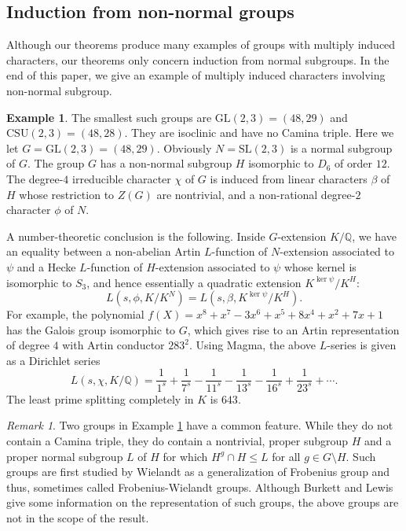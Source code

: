 \documentclass[a4paper,12pt]{article}
\newcommand{\field}[1]{\mathbb{#1}}
\newcommand{\Q}{\field{Q}}
\theoremstyle{definition}
\newtheorem{example}[theorem]{Example}
\theoremstyle{remark}
\newtheorem{remark}[theorem]{Remark}
\numberwithin{equation}{section}
\begin{document}
\subsection{Induction from non-normal groups}
Although our theorems produce many examples of groups with multiply 
induced characters, our theorems only concern induction from normal subgroups.
In the end of this paper, we give an example of multiply induced characters 
involving non-normal subgroup.

\begin{example} \label{ex:5.7}
The smallest such groups are $\mathrm{GL}(2,3)=(48,29)$ and $\mathrm{CSU}(2,3)=(48,28)$.
They are isoclinic and have no Camina triple.
Here we let $G=\mathrm{GL}(2,3)=(48,29)$. Obviously $N=\mathrm{SL}(2,3)$ 
is a normal subgroup of $G$. The group $G$ has a non-normal subgroup $H$ isomorphic 
to $D_6$ of order $12$.
The degree-$4$ irreducible character $\chi $ of $G$ is induced from 
linear characters $\beta$ of $H$ whose restriction to $Z(G)$ are nontrivial, and 
a non-rational degree-$2$ character $\phi $ of $N$.

A number-theoretic conclusion is the following. Inside $G$-extension $K/\Q$, we have
an equality between a non-abelian Artin $L$-function of $N$-extension 
associated to $\psi$ and a Hecke $L$-function of $H$-extension associated 
to $\psi $ whose kernel is isomorphic to $S_3$, and hence essentially a 
quadratic extension $K^{\ker \psi}/K^H$:
\[
 L (s, \phi, K/K^N) = L (s,\beta, K^{\ker \psi }/K^H).
\]
For example, the polynomial $f(X)=x^8 + x^7 - 3x^6 + x^5 + 8x^4 + x^2 + 7x + 1$ has the Galois 
group isomorphic to $G$, which gives rise to an Artin representation of degree $4$ with 
Artin conductor $283^2$.
Using Magma, the above $L$-series is given as a Dirichlet series
\[
L (s, \chi , K/\Q ) = \frac{1}{1^s} + \frac{1}{7^s} - \frac{1}{11^s} -\frac{1}{13^s}  -\frac{1}{16^s}
+\frac{1}{23^s} + \cdots.
\]
The least prime splitting completely in $K$ is $643$.
\end{example}

\begin{remark}
Two groups in Example \ref{ex:5.7} have a common feature.
While they do not contain a Camina triple, 
they do contain a nontrivial, proper subgroup $H$ and a proper normal subgroup $L$ of $H$ for which $H^g \cap H \le L$
for all $g \in G \setminus H$. Such groups are first studied by Wielandt as a generalization of Frobenius group and thus, sometimes called Frobenius-Wielandt groups.
Although Burkett and Lewis \cite[Theorem D]{MR4166586} give some information on the representation of such groups,
the above groups are not in the scope of the result.
\end{remark}
            
\end{document}
